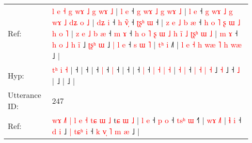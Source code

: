 \documentclass[10pt]{article}
\DeclareRobustCommand{\hl}[1]{{\textcolor{red}{#1}}}
\begin{document}
\begin{longtable}{ll}
Ref: & \hl{l}\hl{ }\hl{e}\hl{ }\hl{˧}\hl{ }\hl{g}\hl{ }\hl{w}\hl{ɤ}\hl{ }\hl{˩}\hl{ }\hl{g} \hl{w}\hl{ɤ} \hl{˩} |\hl{ }\hl{l}\hl{ }\hl{e} ˧\hl{ }\hl{g}\hl{ }\hl{w}\hl{ɤ}\hl{ }\hl{˩}\hl{ }\hl{g}\hl{ }\hl{w}\hl{ɤ}\hl{ }\hl{˩} |\hl{ }\hl{l}\hl{ }\hl{e} ˧\hl{ }\hl{g}\hl{ }\hl{w}\hl{ɤ}\hl{ }\hl{˩}\hl{ }\hl{g}\hl{ }\hl{w}\hl{ɤ}\hl{ }\hl{˩}\hl{ }\hl{d}\hl{ʑ}\hl{ }\hl{o}\hl{ }\hl{˩} |\hl{ }\hl{d}\hl{ʑ}\hl{ }\hl{i} ˧\hl{ }\hl{h} \hl{v}\hl{̃}\hl{̩} ˧\hl{ }\hl{ʈ}\hl{ʂ}\hl{ʰ} \hl{ɯ} ˧ |\hl{ }\hl{z}\hl{ }\hl{e}\hl{ }\hl{˩}\hl{ }\hl{b}\hl{ }\hl{æ} ˧\hl{ }\hl{h}\hl{ }\hl{o}\hl{ }\hl{˥}\hl{ }\hl{ʂ}\hl{ }\hl{ɯ}\hl{ }\hl{˩}\hl{ }\hl{h}\hl{ }\hl{o}\hl{ }\hl{˥} |\hl{ }\hl{z}\hl{ }\hl{e}\hl{ }\hl{˩}\hl{ }\hl{b}\hl{ }\hl{æ} ˧\hl{ }\hl{m} \hl{ɤ} ˧\hl{ }\hl{h}\hl{ }\hl{o}\hl{ }\hl{˥}\hl{ }\hl{ʂ}\hl{ }\hl{ɯ}\hl{ }\hl{˩}\hl{ }\hl{h}\hl{ }\hl{i}\hl{̃} \hl{˩} \hl{ʈ}\hl{ʂ}\hl{ʰ} \hl{ɯ} \hl{˩} | \hl{m} \hl{ɤ} ˧\hl{ }\hl{h} \hl{o} \hl{˩} \hl{h} \hl{i}\hl{̃} ˩\hl{ }\hl{ʈ}\hl{ʂ}\hl{ʰ} \hl{ɯ} ˩\hl{ }\hl{|}\hl{ }\hl{l}\hl{ }\hl{e} ˧\hl{ }\hl{s}\hl{ }\hl{ɯ} \hl{˥} |\hl{ }\hl{t}\hl{ʰ}\hl{ }\hl{i} ˩\hl{˥} |\hl{ }\hl{l}\hl{ }\hl{e}\hl{ }\hl{˧}\hl{ }\hl{h}\hl{ }\hl{w}\hl{æ}\hl{ }\hl{˥}\hl{ }\hl{h}\hl{ }\hl{w}\hl{æ} ˩ |
 \\
Hyp: & \hl{}\hl{}\hl{}\hl{}\hl{}\hl{}\hl{}\hl{}\hl{}\hl{}\hl{}\hl{}\hl{t}\hl{ʰ} \hl{}\hl{i} \hl{˧} |\hl{}\hl{}\hl{}\hl{} ˧\hl{}\hl{}\hl{}\hl{}\hl{}\hl{}\hl{}\hl{}\hl{}\hl{}\hl{}\hl{}\hl{}\hl{} |\hl{}\hl{}\hl{}\hl{} ˧\hl{}\hl{}\hl{}\hl{}\hl{}\hl{}\hl{}\hl{}\hl{}\hl{}\hl{}\hl{}\hl{}\hl{}\hl{}\hl{}\hl{}\hl{}\hl{}\hl{}\hl{} |\hl{}\hl{}\hl{}\hl{}\hl{} ˧\hl{}\hl{} \hl{}\hl{}\hl{|} ˧\hl{}\hl{}\hl{}\hl{} \hl{|} ˧ |\hl{}\hl{}\hl{}\hl{}\hl{}\hl{}\hl{}\hl{}\hl{}\hl{} ˧\hl{}\hl{}\hl{}\hl{}\hl{}\hl{}\hl{}\hl{}\hl{}\hl{}\hl{}\hl{}\hl{}\hl{}\hl{}\hl{}\hl{}\hl{} |\hl{}\hl{}\hl{}\hl{}\hl{}\hl{}\hl{}\hl{}\hl{}\hl{} ˧\hl{}\hl{} \hl{|} ˧\hl{}\hl{}\hl{}\hl{}\hl{}\hl{}\hl{}\hl{}\hl{}\hl{}\hl{}\hl{}\hl{}\hl{}\hl{}\hl{}\hl{} \hl{|} \hl{}\hl{}\hl{˧} \hl{|} \hl{˧} | \hl{˧} \hl{|} ˧\hl{}\hl{} \hl{|} \hl{˧} \hl{|} \hl{}\hl{˧} ˩\hl{}\hl{}\hl{}\hl{} \hl{˧} ˩\hl{}\hl{}\hl{}\hl{}\hl{}\hl{} ˧\hl{}\hl{}\hl{}\hl{} \hl{˩} |\hl{}\hl{}\hl{}\hl{}\hl{} ˩\hl{} |\hl{}\hl{}\hl{}\hl{}\hl{}\hl{}\hl{}\hl{}\hl{}\hl{}\hl{}\hl{}\hl{}\hl{}\hl{}\hl{}\hl{}\hl{} ˩ |
 \\
\midrule
Utterance ID: & 247 \\
Ref: & \hl{w}\hl{ɤ}\hl{ }\hl{˩}\hl{˥}\hl{ }\hl{|}\hl{ }\hl{l}\hl{ }\hl{e}\hl{ }\hl{˧}\hl{ }\hl{t}\hl{ɕ}\hl{ }\hl{ɯ}\hl{ }\hl{˩}\hl{ }t\hl{ɕ} \hl{ɯ} \hl{˩} |\hl{ }\hl{l}\hl{ }\hl{e} ˧\hl{ }\hl{p} \hl{o} ˧\hl{ }\hl{t}\hl{s}\hl{ʰ} \hl{ɯ} ˧\hl{˥} |\hl{ }\hl{w}\hl{ɤ} \hl{˩}\hl{˥} |\hl{ }\hl{ɬ}\hl{ }\hl{i} ˧\hl{ }\hl{d}\hl{ }\hl{i} ˩\hl{ }\hl{|}\hl{ }\hl{t}\hl{ɕ}\hl{ʰ}\hl{ }\hl{i} ˧\hl{ }\hl{k}\hl{ }\hl{v}\hl{̩}\hl{ }\hl{˥} \hl{m} \hl{æ} ˩ |

\end{longtable}
\end{document}
